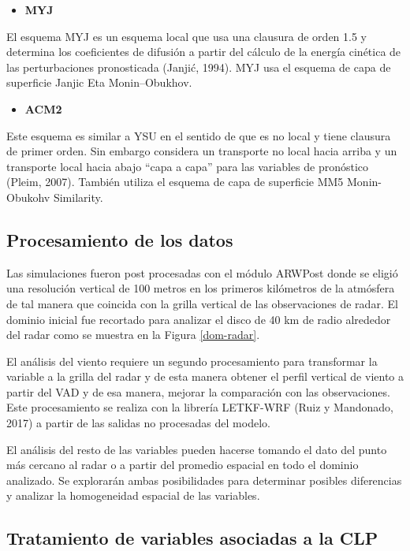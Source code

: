 \documentclass[12pt,spanish,oneside, a4paper]{book}
\providecommand{\tightlist}{%
  \setlength{\itemsep}{0pt}\setlength{\parskip}{0pt}}
\begin{document}
\begin{itemize}
\tightlist
\item
  \textbf{MYJ}
\end{itemize}

El esquema MYJ es un esquema local que usa una clausura de orden 1.5 y
determina los coeficientes de difusión a partir del cálculo de la
energía cinética de las perturbaciones pronosticada (Janjić, 1994). MYJ
usa el esquema de capa de superficie Janjic Eta Monin--Obukhov.

\begin{itemize}
\tightlist
\item
  \textbf{ACM2}
\end{itemize}

Este esquema es similar a YSU en el sentido de que es no local y tiene
clausura de primer orden. Sin embargo considera un transporte no local
hacia arriba y un transporte local hacia abajo ``capa a capa'' para las
variables de pronóstico (Pleim, 2007). También utiliza el esquema de
capa de superficie MM5 Monin-Obukohv Similarity.

\subsection{Procesamiento de los
datos}\label{procesamiento-de-los-datos}

Las simulaciones fueron post procesadas con el módulo ARWPost donde se
eligió una resolución vertical de 100 metros en los primeros kilómetros
de la atmósfera de tal manera que coincida con la grilla vertical de las
observaciones de radar. El dominio inicial fue recortado para analizar
el disco de 40 km de radio alrededor del radar como se muestra en la
Figura \ref{dom-radar}.

El análisis del viento requiere un segundo procesamiento para
transformar la variable a la grilla del radar y de esta manera obtener
el perfil vertical de viento a partir del VAD y de esa manera, mejorar
la comparación con las observaciones. Este procesamiento se realiza con
la librería LETKF-WRF (Ruiz y Mandonado, 2017) a partir de las salidas
no procesadas del modelo.

El análisis del resto de las variables pueden hacerse tomando el dato
del punto más cercano al radar o a partir del promedio espacial en todo
el dominio analizado. Se explorarán ambas posibilidades para determinar
posibles diferencias y analizar la homogeneidad espacial de las
variables.

\subsection{Tratamiento de variables asociadas a la
CLP}\label{tratamiento-de-variables-asociadas-a-la-clp}
\end{document}
